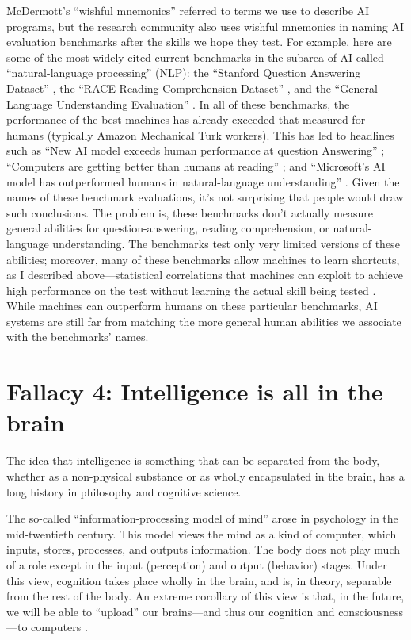 \documentclass[12pt]{article}
\begin{document}
McDermott's ``wishful mnemonics'' referred to terms we use to describe AI programs, but the research community also uses wishful mnemonics in naming AI evaluation benchmarks after the skills we hope they test.  For example, here are some of the most widely cited current benchmarks in the subarea of AI called ``natural-language processing'' (NLP):  the ``Stanford Question Answering Dataset'' \cite{SQUAD}, the ``RACE Reading Comprehension Dataset'' \cite{RACEDataset}, and the ``General Language Understanding Evaluation'' \cite{GLUEBenchmark}.   In all of these benchmarks, the performance of the best machines has already exceeded that measured for humans (typically Amazon Mechanical Turk workers).  This has led to headlines such as ``New AI model exceeds human performance at question Answering'' \cite{Costenaro2018}; ``Computers are getting better than humans at reading'' \cite{Pham2018};  and ``Microsoft's AI model has outperformed humans in natural-language understanding'' \cite{Jawad2021}. Given the names of these benchmark evaluations, it's not surprising that people would draw such conclusions.  The problem is, these benchmarks don't actually measure general abilities for question-answering, reading comprehension, or natural-language understanding. The benchmarks test only very limited versions of these abilities; moreover, many of these benchmarks allow machines to learn shortcuts, as I described above---statistical correlations that machines can exploit to achieve high performance on the test without learning the actual skill being tested \cite{McCoy2019,Linzen2020}. While machines can outperform humans on these particular benchmarks, AI systems are still far from matching the more general human abilities we associate with the benchmarks' names.  

\section*{Fallacy 4: Intelligence is all in the brain}

The idea that intelligence is something that can be separated from the body, whether as a non-physical substance or as wholly encapsulated in the brain, has a long history in philosophy and cognitive science. 

The so-called ``information-processing model of mind'' arose in psychology in the mid-twentieth century.  This model views the mind as a kind of computer, which inputs, stores, processes, and outputs information. The body does not play much of a role except in the input (perception) and output (behavior) stages.  Under this view, cognition takes place wholly in the brain, and is, in theory, separable from the rest of the body.  An extreme corollary of this view is that, in the future, we will be able to ``upload'' our brains---and thus our cognition and consciousness---to computers \cite{Woollaston2013}. 
\end{document}
